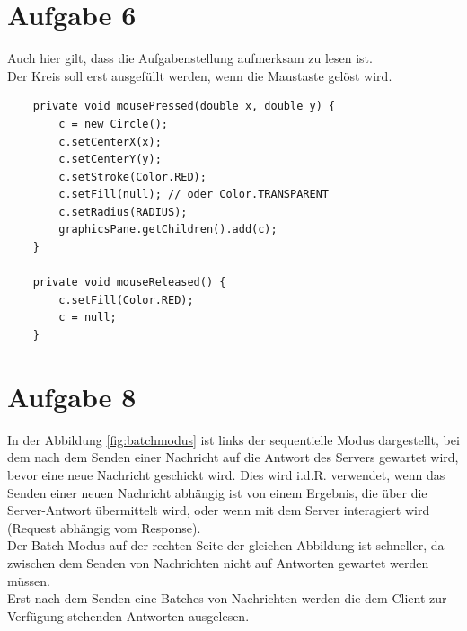 \section{Aufgabe 6}
Auch hier gilt, dass die Aufgabenstellung aufmerksam zu lesen ist.\\
Der Kreis soll erst ausgefüllt werden, wenn die Maustaste gelöst wird.

\begin{verbatim}
    private void mousePressed(double x, double y) {
        c = new Circle();
        c.setCenterX(x);
        c.setCenterY(y);
        c.setStroke(Color.RED);
        c.setFill(null); // oder Color.TRANSPARENT
        c.setRadius(RADIUS);
        graphicsPane.getChildren().add(c);
    }

    private void mouseReleased() {
        c.setFill(Color.RED);
        c = null;
    }
\end{verbatim}

\section{Aufgabe 8}

In der Abbildung \ref{fig:batchmodus} ist links der sequentielle Modus dargestellt, bei dem nach dem Senden einer Nachricht auf die Antwort des Servers gewartet wird, bevor eine neue Nachricht geschickt wird.
Dies wird i.d.R. verwendet, wenn das Senden einer neuen Nachricht abhängig ist von einem Ergebnis, die über die Server-Antwort übermittelt wird, oder wenn mit dem Server interagiert wird (Request abhängig vom Response).\\
Der Batch-Modus auf der rechten Seite der gleichen Abbildung ist schneller, da zwischen dem Senden von Nachrichten nicht auf Antworten gewartet werden müssen. \\
Erst nach dem Senden eine Batches von Nachrichten werden die dem Client zur Verfügung stehenden Antworten ausgelesen.\\

